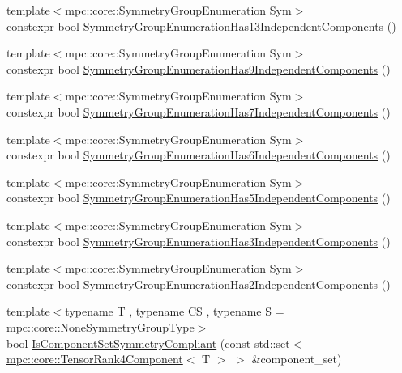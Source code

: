 \begin{DoxyCompactItemize}
\item 
{\footnotesize template$<$mpc\+::core\+::\+Symmetry\+Group\+Enumeration Sym$>$ }\\constexpr bool \mbox{\hyperlink{namespacempc_1_1core_a3963b11549140e877c6b7d3f74382af0}{Symmetry\+Group\+Enumeration\+Has13\+Independent\+Components}} ()
\item 
{\footnotesize template$<$mpc\+::core\+::\+Symmetry\+Group\+Enumeration Sym$>$ }\\constexpr bool \mbox{\hyperlink{namespacempc_1_1core_a5da30dc818b56accc08364c93c331924}{Symmetry\+Group\+Enumeration\+Has9\+Independent\+Components}} ()
\item 
{\footnotesize template$<$mpc\+::core\+::\+Symmetry\+Group\+Enumeration Sym$>$ }\\constexpr bool \mbox{\hyperlink{namespacempc_1_1core_a04ff2937be881ddc1aee34d59d6b7af5}{Symmetry\+Group\+Enumeration\+Has7\+Independent\+Components}} ()
\item 
{\footnotesize template$<$mpc\+::core\+::\+Symmetry\+Group\+Enumeration Sym$>$ }\\constexpr bool \mbox{\hyperlink{namespacempc_1_1core_a35a6a7755ecf1facefe9fc495ba8562e}{Symmetry\+Group\+Enumeration\+Has6\+Independent\+Components}} ()
\item 
{\footnotesize template$<$mpc\+::core\+::\+Symmetry\+Group\+Enumeration Sym$>$ }\\constexpr bool \mbox{\hyperlink{namespacempc_1_1core_af0e68c831123f9f34edf807434016e77}{Symmetry\+Group\+Enumeration\+Has5\+Independent\+Components}} ()
\item 
{\footnotesize template$<$mpc\+::core\+::\+Symmetry\+Group\+Enumeration Sym$>$ }\\constexpr bool \mbox{\hyperlink{namespacempc_1_1core_a794af450ca75ce367faa0f0a282ff54d}{Symmetry\+Group\+Enumeration\+Has3\+Independent\+Components}} ()
\item 
{\footnotesize template$<$mpc\+::core\+::\+Symmetry\+Group\+Enumeration Sym$>$ }\\constexpr bool \mbox{\hyperlink{namespacempc_1_1core_abc0db530207961bd47fd1308595ae226}{Symmetry\+Group\+Enumeration\+Has2\+Independent\+Components}} ()
\item 
{\footnotesize template$<$typename T , typename CS , typename S  = mpc\+::core\+::\+None\+Symmetry\+Group\+Type$>$ }\\bool \mbox{\hyperlink{namespacempc_1_1core_aef4b990e7b443957c2c6bfe0498753d7}{Is\+Component\+Set\+Symmetry\+Compliant}} (const std\+::set$<$ \mbox{\hyperlink{namespacempc_1_1core_ac3a232afc7c680d580628e834030482f}{mpc\+::core\+::\+Tensor\+Rank4\+Component}}$<$ T $>$ $>$ \&component\+\_\+set)

\end{DoxyCompactItemize}
